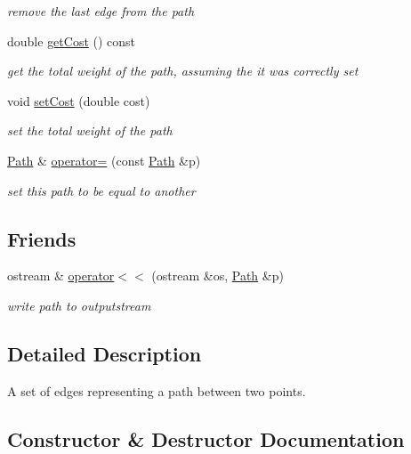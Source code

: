 \begin{DoxyCompactItemize}
\begin{DoxyCompactList}\small\item\em remove the last edge from the path \end{DoxyCompactList}\item 
double \hyperlink{class_path_a2e92339063f0a7df0db8043828864c6d}{get\+Cost} () const 
\begin{DoxyCompactList}\small\item\em get the total weight of the path, assuming the it was correctly set \end{DoxyCompactList}\item 
void \hyperlink{class_path_a3b5228a0e1d37ca0293e82e32ba0fcce}{set\+Cost} (double cost)
\begin{DoxyCompactList}\small\item\em set the total weight of the path \end{DoxyCompactList}\item 
\hyperlink{class_path}{Path} \& \hyperlink{class_path_ad99e1ee379832d5ddb7f94c28759e771}{operator=} (const \hyperlink{class_path}{Path} \&p)
\begin{DoxyCompactList}\small\item\em set this path to be equal to another \end{DoxyCompactList}\end{DoxyCompactItemize}
\subsection*{Friends}
\begin{DoxyCompactItemize}
\item 
ostream \& \hyperlink{class_path_a46ad3a4bc74d84677e6c41299334a15e}{operator$<$$<$} (ostream \&os, \hyperlink{class_path}{Path} \&p)
\begin{DoxyCompactList}\small\item\em write path to outputstream \end{DoxyCompactList}\end{DoxyCompactItemize}


\subsection{Detailed Description}
A set of edges representing a path between two points. 

\subsection{Constructor \& Destructor Documentation}
\hypertarget{class_path_ad2c6ad256aaa8f14e04a454e5690c961}{}
